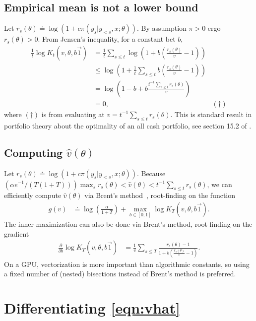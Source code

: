 \documentclass{article}
\begin{document}
\subsection{Empirical mean is not a lower bound} \label{app:setupperbound}
Let $r_s(\theta) \doteq \log(1 + c \pi(y_s|y_{<s},x;\theta))$.  By assumption $\pi > 0$ ergo $r_s(\theta) > 0$.  From Jensen's inequality, for a constant bet $b$,
\begin{align*}
\frac{1}{t} \log K_t\left(v, \theta, b \vec{1}\right) &= \frac{1}{t} \sum_{s \leq t} \log\left(1 + b \left( \frac{r_s(\theta)}{v} - 1 \right) \right) \\
&\leq \log \left( 1 + \frac{1}{t} \sum_{s \leq t} b \left( \frac{r_s(\theta)}{v} - 1 \right) \right) \\
&= \log \left( 1 - b + b  \frac{t^{-1} \sum_{s \leq t} r_s(\theta)}{v} \right) \\
&= 0, & \left(\dagger\right)
\end{align*}
where $(\dagger)$ is from evaluating at $v = t^{-1} \sum_{s \leq t} r_s(\theta)$. This is standard result in portfolio theory about the optimality of an all cash portfolio, see section 15.2 of \textcite{cover1999elements}.

\subsection{Computing $\hat{v}(\theta)$} \label{app:vhat}

Let $r_s(\theta) \doteq \log(1 + c \pi(y_s|y_{<s},x;\theta))$. 
Because $(\alpha e^{-1} / (T (1 + T))) \max_s r_s(\theta) < \hat{v}(\theta) < t^{-1} \sum_{s \leq t} r_s(\theta)$, we can efficiently compute $\hat{v}(\theta)$ via Brent's method~\parencite{brent1973}, root-finding on the function
\begin{align*}
g(v) &\doteq \log\left(\frac{\alpha}{1+T}\right) + \max_{b \in [0, 1]} \log K_T(v, \theta, b \vec{1}).
\end{align*}
The inner maximization can also be done via Brent's method, root-finding on the gradient
\begin{align*}
\frac{\partial}{\partial b} \log K_T(v, \theta, b \vec{1}) &= \frac{1}{v} \sum_{s \leq T} \frac{r_s(\theta) - 1}{1 + b \left( \frac{r_s(\theta)}{v} - 1 \right)}.
\end{align*}
On a GPU, vectorization is more important than algorithmic constants, so using a fixed number of (nested) bisections instead of Brent's method is preferred.

\section{Differentiating \cref{eqn:vhat}} \label{app:gradvhat}
\end{document}
